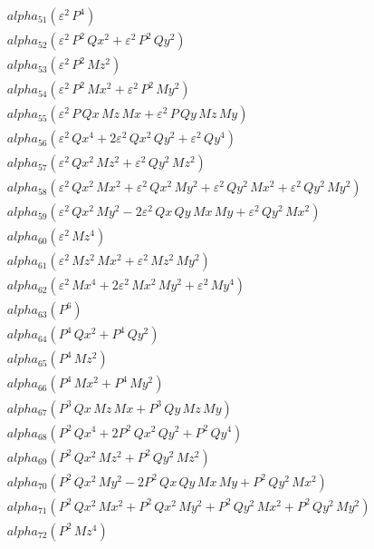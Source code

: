 \documentclass{article}
\begin{document}
\begin{align*}
  &\quad alpha_{51} \left(ε^{2}\,P^{4}\right) \\
  &\quad alpha_{52} \left(ε^{2}\,P^{2}\,Qx^{2} + ε^{2}\,P^{2}\,Qy^{2}\right) \\
  &\quad alpha_{53} \left(ε^{2}\,P^{2}\,Mz^{2}\right) \\
  &\quad alpha_{54} \left(ε^{2}\,P^{2}\,Mx^{2} + ε^{2}\,P^{2}\,My^{2}\right) \\
  &\quad alpha_{55} \left(ε^{2}\,P\,Qx\,Mz\,Mx + ε^{2}\,P\,Qy\,Mz\,My\right) \\
  &\quad alpha_{56} \left(ε^{2}\,Qx^{4} + 2ε^{2}\,Qx^{2}\,Qy^{2} + ε^{2}\,Qy^{4}\right) \\
  &\quad alpha_{57} \left(ε^{2}\,Qx^{2}\,Mz^{2} + ε^{2}\,Qy^{2}\,Mz^{2}\right) \\
  &\quad alpha_{58} \left(ε^{2}\,Qx^{2}\,Mx^{2} + ε^{2}\,Qx^{2}\,My^{2} + ε^{2}\,Qy^{2}\,Mx^{2} + ε^{2}\,Qy^{2}\,My^{2}\right) \\
  &\quad alpha_{59} \left(ε^{2}\,Qx^{2}\,My^{2} - 2ε^{2}\,Qx\,Qy\,Mx\,My + ε^{2}\,Qy^{2}\,Mx^{2}\right) \\
  &\quad alpha_{60} \left(ε^{2}\,Mz^{4}\right) \\
  &\quad alpha_{61} \left(ε^{2}\,Mz^{2}\,Mx^{2} + ε^{2}\,Mz^{2}\,My^{2}\right) \\
  &\quad alpha_{62} \left(ε^{2}\,Mx^{4} + 2ε^{2}\,Mx^{2}\,My^{2} + ε^{2}\,My^{4}\right) \\
  &\quad alpha_{63} \left(P^{6}\right) \\
  &\quad alpha_{64} \left(P^{4}\,Qx^{2} + P^{4}\,Qy^{2}\right) \\
  &\quad alpha_{65} \left(P^{4}\,Mz^{2}\right) \\
  &\quad alpha_{66} \left(P^{4}\,Mx^{2} + P^{4}\,My^{2}\right) \\
  &\quad alpha_{67} \left(P^{3}\,Qx\,Mz\,Mx + P^{3}\,Qy\,Mz\,My\right) \\
  &\quad alpha_{68} \left(P^{2}\,Qx^{4} + 2P^{2}\,Qx^{2}\,Qy^{2} + P^{2}\,Qy^{4}\right) \\
  &\quad alpha_{69} \left(P^{2}\,Qx^{2}\,Mz^{2} + P^{2}\,Qy^{2}\,Mz^{2}\right) \\
  &\quad alpha_{70} \left(P^{2}\,Qx^{2}\,My^{2} - 2P^{2}\,Qx\,Qy\,Mx\,My + P^{2}\,Qy^{2}\,Mx^{2}\right) \\
  &\quad alpha_{71} \left(P^{2}\,Qx^{2}\,Mx^{2} + P^{2}\,Qx^{2}\,My^{2} + P^{2}\,Qy^{2}\,Mx^{2} + P^{2}\,Qy^{2}\,My^{2}\right) \\
  &\quad alpha_{72} \left(P^{2}\,Mz^{4}\right) \\

\end{align*}
\end{document}
